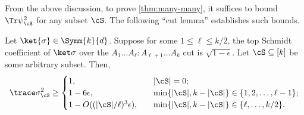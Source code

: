 From the above discussion, to prove \cref{thm:many-many}, it suffices to bound $\Tr\psi_\cS^2$ for any subset $\cS$. The following ``cut lemma'' establishes such bounds. 
\begin{lemma}\label{lem:cut}
Let $\ket{\sigma}\in \Symm{k}{d}$.
Suppose for some  $1\le\ell \le k/2$, the top Schmidt coefficient of $\ket\sigma$ over the $A_1\ldots A_\ell : A_{\ell+1}\ldots A_k$ cut is $\sqrt{1-\epsilon}$. Let $\cS\subseteq [k]$ be some arbitrary  subset.
Then, 
\[
    \trace \sigma_\cS ^2 \ge \begin{cases}
        1, & \quad |\cS|  = 0;
        \\
        1-6\epsilon, & \quad \min\{|\cS|, k-|\cS|\} \in \{1,2,\ldots, \ell-1\};
        \\
        1- O((|\cS|/\ell)^3\epsilon), &\quad \min\{|\cS| , k-|\cS|\}\in \{\ell,\ldots, k/2\}.
    \end{cases}
\]
\end{lemma}
